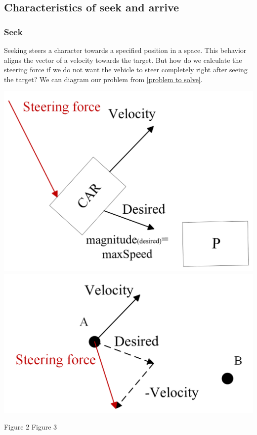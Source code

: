 \documentclass[10pt,twoside,english,a4paper]{article}
\begin{document}
\subsection{Characteristics of seek and arrive } \label{characterictics of seek and arrive}

\subsubsection{Seek} \label{seek}

Seeking steers a character towards a specified position in a space. 
This behavior aligns the vector of a velocity towards the target. 
But how do we calculate the steering force if we do not want the 
vehicle to steer completely right after seeing the target? We can 
diagram our problem from \ref{problem to solve}.

\includegraphics[scale=0.22]{diagram_car.png} 	
\includegraphics[scale=0.22]{diagram_steeringForce.png}\par
\quad Figure 2 
\hspace*{\fill} Figure 3
\bigbreak
\end{document}
